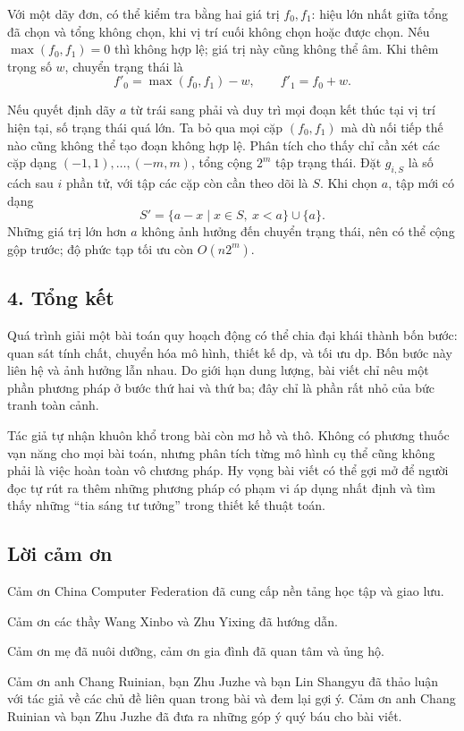 \documentclass[11pt]{article}
\begin{document}
Với một dãy đơn, có thể kiểm tra bằng hai giá trị \(f_0,f_1\): hiệu lớn nhất
giữa tổng đã chọn và tổng không chọn, khi vị trí cuối không chọn hoặc được
chọn. Nếu \(\max(f_0,f_1)=0\) thì không hợp lệ; giá trị này cũng không thể âm.
Khi thêm trọng số \(w\), chuyển trạng thái là
\[
  f'_0=\max(f_0,f_1)-w,\qquad f'_1=f_0+w.
\]

Nếu quyết định dãy \(a\) từ trái sang phải và duy trì mọi đoạn kết thúc tại vị
trí hiện tại, số trạng thái quá lớn. Ta bỏ qua mọi cặp \((f_0,f_1)\) mà dù nối
tiếp thế nào cũng không thể tạo đoạn không hợp lệ. Phân tích cho thấy chỉ cần
xét các cặp dạng \((-1,1),\ldots,(-m,m)\), tổng cộng \(2^m\) tập trạng thái.
Đặt \(g_{i,S}\) là số cách sau \(i\) phần tử, với tập các cặp còn cần theo dõi
là \(S\). Khi chọn \(a\), tập mới có dạng
\[
  S'=\{a-x\mid x\in S,\ x<a\}\cup\{a\}.
\]
Những giá trị lớn hơn \(a\) không ảnh hưởng đến chuyển trạng thái, nên có thể
cộng gộp trước; độ phức tạp tối ưu còn \(O(n2^m)\).

\subsection*{4. Tổng kết}

Quá trình giải một bài toán quy hoạch động có thể chia đại khái thành bốn
bước: quan sát tính chất, chuyển hóa mô hình, thiết kế \(\mathrm{dp}\), và tối
ưu \(\mathrm{dp}\). Bốn bước này liên hệ và ảnh hưởng lẫn nhau. Do giới hạn
dung lượng, bài viết chỉ nêu một phần phương pháp ở bước thứ hai và thứ ba; đây
chỉ là phần rất nhỏ của bức tranh toàn cảnh.

Tác giả tự nhận khuôn khổ trong bài còn mơ hồ và thô. Không có phương thuốc
vạn năng cho mọi bài toán, nhưng phân tích từng mô hình cụ thể cũng không phải
là việc hoàn toàn vô chương pháp. Hy vọng bài viết có thể gợi mở để người đọc
tự rút ra thêm những phương pháp có phạm vi áp dụng nhất định và tìm thấy những
``tia sáng tư tưởng'' trong thiết kế thuật toán.

\subsection*{Lời cảm ơn}

Cảm ơn China Computer Federation đã cung cấp nền tảng học tập và giao lưu.

Cảm ơn các thầy Wang Xinbo và Zhu Yixing đã hướng dẫn.

Cảm ơn mẹ đã nuôi dưỡng, cảm ơn gia đình đã quan tâm và ủng hộ.

Cảm ơn anh Chang Ruinian, bạn Zhu Juzhe và bạn Lin Shangyu đã thảo luận với tác
giả về các chủ đề liên quan trong bài và đem lại gợi ý. Cảm ơn anh Chang
Ruinian và bạn Zhu Juzhe đã đưa ra những góp ý quý báu cho bài viết.
\end{document}
